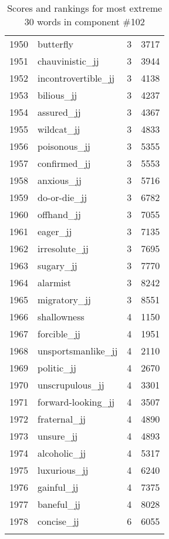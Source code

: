 \begin{longtable}[!htbp]{| rlr@{.}l |}
    1950 & butterfly & 3 & 3717 \\
    1951 & chauvinistic\_jj & 3 & 3944 \\
    1952 & incontrovertible\_jj & 3 & 4138 \\
    1953 & bilious\_jj & 3 & 4237 \\
    1954 & assured\_jj & 3 & 4367 \\
    1955 & wildcat\_jj & 3 & 4833 \\
    1956 & poisonous\_jj & 3 & 5355 \\
    1957 & confirmed\_jj & 3 & 5553 \\
    1958 & anxious\_jj & 3 & 5716 \\
    1959 & do-or-die\_jj & 3 & 6782 \\
    1960 & offhand\_jj & 3 & 7055 \\
    1961 & eager\_jj & 3 & 7135 \\
    1962 & irresolute\_jj & 3 & 7695 \\
    1963 & sugary\_jj & 3 & 7770 \\
    1964 & alarmist & 3 & 8242 \\
    1965 & migratory\_jj & 3 & 8551 \\
    1966 & shallowness & 4 & 1150 \\
    1967 & forcible\_jj & 4 & 1951 \\
    1968 & unsportsmanlike\_jj & 4 & 2110 \\
    1969 & politic\_jj & 4 & 2670 \\
    1970 & unscrupulous\_jj & 4 & 3301 \\
    1971 & forward-looking\_jj & 4 & 3507 \\
    1972 & fraternal\_jj & 4 & 4890 \\
    1973 & unsure\_jj & 4 & 4893 \\
    1974 & alcoholic\_jj & 4 & 5317 \\
    1975 & luxurious\_jj & 4 & 6240 \\
    1976 & gainful\_jj & 4 & 7375 \\
    1977 & baneful\_jj & 4 & 8028 \\
    1978 & concise\_jj & 6 & 6055 \\
    \hline
    \caption{Scores and rankings for most extreme 30 words in component \#102} \\
\end{longtable}
